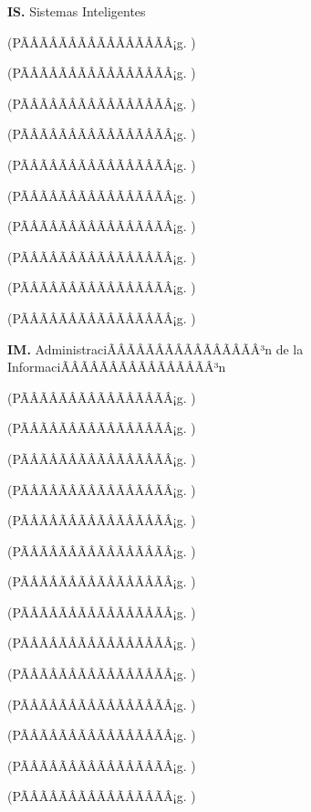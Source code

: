	\textbf{IS.}  Sistemas Inteligentes%
	\begin{list}{}{%
		\setlength{\labelwidth}{0pt}%
		\setlength{\leftmargin}{15pt}}%
		\item \ISUNODef(PÃÂÃÂÃÂÃÂÃÂÃÂÃÂÃÂ¡g. \pageref{sec:BOK-IS1})
		\item \ISDOSDef(PÃÂÃÂÃÂÃÂÃÂÃÂÃÂÃÂ¡g. \pageref{sec:BOK-IS2})
		\item \ISTRESDef(PÃÂÃÂÃÂÃÂÃÂÃÂÃÂÃÂ¡g. \pageref{sec:BOK-IS3})
		\item \ISCUATRODef(PÃÂÃÂÃÂÃÂÃÂÃÂÃÂÃÂ¡g. \pageref{sec:BOK-IS4})
		\item \ISCINCODef(PÃÂÃÂÃÂÃÂÃÂÃÂÃÂÃÂ¡g. \pageref{sec:BOK-IS5})
		\item \ISSEISDef(PÃÂÃÂÃÂÃÂÃÂÃÂÃÂÃÂ¡g. \pageref{sec:BOK-IS6})
		\item \ISSIETEDef(PÃÂÃÂÃÂÃÂÃÂÃÂÃÂÃÂ¡g. \pageref{sec:BOK-IS7})
		\item \ISOCHODef(PÃÂÃÂÃÂÃÂÃÂÃÂÃÂÃÂ¡g. \pageref{sec:BOK-IS8})
		\item \ISNUEVEDef(PÃÂÃÂÃÂÃÂÃÂÃÂÃÂÃÂ¡g. \pageref{sec:BOK-IS9})
		\item \ISDIEZDef(PÃÂÃÂÃÂÃÂÃÂÃÂÃÂÃÂ¡g. \pageref{sec:BOK-IS10})
	\end{list}%
	\textbf{IM.}  AdministraciÃÂÃÂÃÂÃÂÃÂÃÂÃÂÃÂ³n de la InformaciÃÂÃÂÃÂÃÂÃÂÃÂÃÂÃÂ³n%
	\begin{list}{}{%
		\setlength{\labelwidth}{0pt}%
		\setlength{\leftmargin}{15pt}}%
		\item \IMUNODef(PÃÂÃÂÃÂÃÂÃÂÃÂÃÂÃÂ¡g. \pageref{sec:BOK-IM1})
		\item \IMDOSDef(PÃÂÃÂÃÂÃÂÃÂÃÂÃÂÃÂ¡g. \pageref{sec:BOK-IM2})
		\item \IMTRESDef(PÃÂÃÂÃÂÃÂÃÂÃÂÃÂÃÂ¡g. \pageref{sec:BOK-IM3})
		\item \IMCUATRODef(PÃÂÃÂÃÂÃÂÃÂÃÂÃÂÃÂ¡g. \pageref{sec:BOK-IM4})
		\item \IMCINCODef(PÃÂÃÂÃÂÃÂÃÂÃÂÃÂÃÂ¡g. \pageref{sec:BOK-IM5})
		\item \IMSEISDef(PÃÂÃÂÃÂÃÂÃÂÃÂÃÂÃÂ¡g. \pageref{sec:BOK-IM6})
		\item \IMSIETEDef(PÃÂÃÂÃÂÃÂÃÂÃÂÃÂÃÂ¡g. \pageref{sec:BOK-IM7})
		\item \IMOCHODef(PÃÂÃÂÃÂÃÂÃÂÃÂÃÂÃÂ¡g. \pageref{sec:BOK-IM8})
		\item \IMNUEVEDef(PÃÂÃÂÃÂÃÂÃÂÃÂÃÂÃÂ¡g. \pageref{sec:BOK-IM9})
		\item \IMDIEZDef(PÃÂÃÂÃÂÃÂÃÂÃÂÃÂÃÂ¡g. \pageref{sec:BOK-IM10})
		\item \IMONCEDef(PÃÂÃÂÃÂÃÂÃÂÃÂÃÂÃÂ¡g. \pageref{sec:BOK-IM11})
		\item \IMDOCEDef(PÃÂÃÂÃÂÃÂÃÂÃÂÃÂÃÂ¡g. \pageref{sec:BOK-IM12})
		\item \IMTRECEDef(PÃÂÃÂÃÂÃÂÃÂÃÂÃÂÃÂ¡g. \pageref{sec:BOK-IM13})
		\item \IMCATORCEDef(PÃÂÃÂÃÂÃÂÃÂÃÂÃÂÃÂ¡g. \pageref{sec:BOK-IM14})
	\end{list}%
